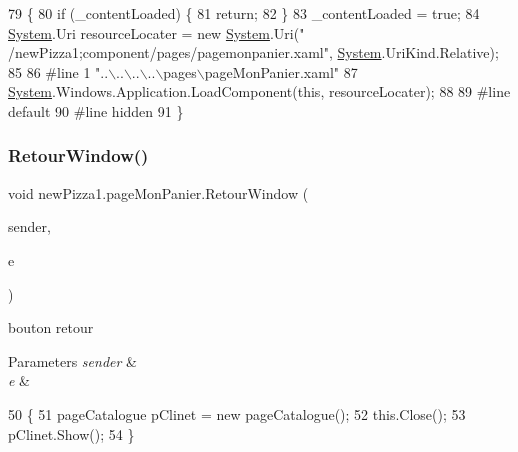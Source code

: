 \begin{DoxyCode}
79                                           \{
80             \textcolor{keywordflow}{if} (\_contentLoaded) \{
81                 \textcolor{keywordflow}{return};
82             \}
83             \_contentLoaded = \textcolor{keyword}{true};
84             \hyperlink{namespaceSystem}{System}.Uri resourceLocater = \textcolor{keyword}{new} \hyperlink{namespaceSystem}{System}.Uri(\textcolor{stringliteral}{"
      /newPizza1;component/pages/pagemonpanier.xaml"}, \hyperlink{namespaceSystem}{System}.UriKind.Relative);
85             
86 \textcolor{preprocessor}{            #line 1 "..\(\backslash\)..\(\backslash\)..\(\backslash\)..\(\backslash\)pages\(\backslash\)pageMonPanier.xaml"
}
87             \hyperlink{namespaceSystem}{System}.Windows.Application.LoadComponent(\textcolor{keyword}{this}, resourceLocater);
88             
89 \textcolor{preprocessor}{            #line default
}
90 \textcolor{preprocessor}{            #line hidden
}
91         \}
\end{DoxyCode}
\mbox{\label{classnewPizza1_1_1pageMonPanier_a38a35540b86440e0363db4da6b419c9b}} 
\subsubsection{\texorpdfstring{Retour\+Window()}{RetourWindow()}}
{\footnotesize\ttfamily void new\+Pizza1.\+page\+Mon\+Panier.\+Retour\+Window (\begin{DoxyParamCaption}\item[{object}]{sender,  }\item[{Routed\+Event\+Args}]{e }\end{DoxyParamCaption})\hspace{0.3cm}{\ttfamily [inline]}}



bouton retour 


\begin{DoxyParams}{Parameters}
{\em sender} & \\
\hline
{\em e} & \\
\hline
\end{DoxyParams}

\begin{DoxyCode}
50         \{
51             pageCatalogue pClinet = \textcolor{keyword}{new} pageCatalogue();
52             this.Close();
53             pClinet.Show();
54         \}
\end{DoxyCode}


